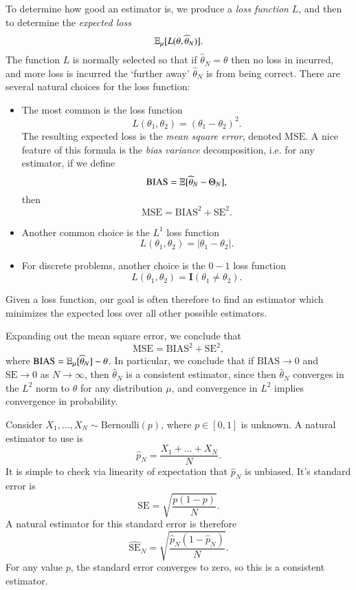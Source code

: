 To determine how good an estimator is, we produce a \emph{loss function} $L$, and then to determine the \emph{expected loss}
%
\[ \operatorname{\mathbb{E}}_\mu[ L(\theta, \widehat{\theta}_N) ]. \]
%
The function $L$ is normally selected so that if $\widehat{\theta}_N = \theta$ then no loss in incurred, and more loss is incurred the `further away' $\widehat{\theta}_N$ is from being correct. There are several natural choices for the loss function:
%
\begin{itemize}
	\item The most common is the loss function
	\[ L(\theta_1,\theta_2) = (\theta_1 - \theta_2)^2. \]
	The resulting expected loss is the \emph{mean square error}, denoted $\text{MSE}$. A nice feature of this formula is the \emph{bias} \emph{variance} decomposition, i.e. for any estimator, if we define
	\[ \text{BIAS} = \operatorname{\mathbb{E}}[ \widehat{\theta}_N - \Theta_N ], \]
	then
	\[ \text{MSE} = \text{BIAS}^2 + \text{SE}^2. \]

	\item Another common choice is the $L^1$ loss function
	\[ L(\theta_1,\theta_2) = |\theta_1 - \theta_2|. \]

	\item For discrete problems, another choice is the $0-1$ loss function
	\[ L(\theta_1,\theta_2) = \mathbf{I}(\theta_1 \neq \theta_2). \]
\end{itemize}
%
Given a loss function, our goal is often therefore to find an estimator which minimizes the expected loss over all other possible estimators.

Expanding out the mean square error, we conclude that
%
\[ \text{MSE} = \text{BIAS}^2 + \text{SE}^2, \]
%
where $\text{BIAS} = \operatorname{\mathbb{E}}_\mu[ \widehat{\theta}_N ] - \theta$. In particular, we conclude that if $\text{BIAS} \to 0$ and $\text{SE} \to 0$ as $N \to \infty$, then $\widehat{\theta}_N$ is a consistent estimator, since then $\widehat{\theta}_N$ converges in the $L^2$ norm to $\theta$ for any distribution $\mu$, and convergence in $L^2$ implies convergence in probability.

\begin{example}
	Consider $X_1,\dots,X_N \sim \text{Bernoulli}(p)$, where $p \in [0,1]$ is unknown. A natural estimator to use is
	\[ \widehat{p}_N = \frac{X_1 + \dots + X_N}{N}. \]
	It is simple to check via linearity of expectation that $\widehat{p}_N$ is unbiased. It's standard error is
	\[ \text{SE} = \sqrt{\frac{p(1-p)}{N}}. \]
	A natural estimator for this standard error is therefore
	\[ \widehat{\text{SE}}_N = \sqrt{\frac{\widehat{p}_N (1 - \widehat{p}_N)}{N}}. \]
	For any value $p$, the standard error converges to zero, so this is a consistent estimator.
\end{example}

